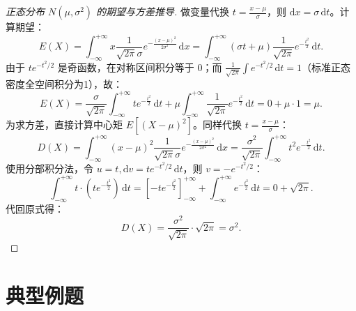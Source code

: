 ﻿\documentclass[lang=cn,11pt]{elegantbook}
\begin{document}
\begin{proof}[正态分布 $N(\mu,\sigma^2)$ 的期望与方差推导]
做变量代换 $t = \frac{x-\mu}{\sigma}$，则 $\mathrm{d}x = \sigma \,\mathrm{d}t$。计算期望：
\[
E(X) = \int_{-\infty}^{+\infty} x \frac{1}{\sqrt{2\pi}\sigma} e^{-\frac{(x-\mu)^2}{2\sigma^2}} \,\mathrm{d}x = \int_{-\infty}^{+\infty} (\sigma t + \mu) \frac{1}{\sqrt{2\pi}} e^{-\frac{t^2}{2}} \,\mathrm{d}t.
\]
由于 $t e^{-t^2/2}$ 是奇函数，在对称区间积分等于 $0$；而 $\frac{1}{\sqrt{2\pi}} \int e^{-t^2/2} \,\mathrm{d}t = 1$（标准正态密度全空间积分为1），故：
\[
E(X) = \frac{\sigma}{\sqrt{2\pi}} \int_{-\infty}^{+\infty} t e^{-\frac{t^2}{2}} \,\mathrm{d}t + \mu \int_{-\infty}^{+\infty} \frac{1}{\sqrt{2\pi}} e^{-\frac{t^2}{2}} \,\mathrm{d}t = 0 + \mu \cdot 1 = \mu.
\]
为求方差，直接计算中心矩 $E[(X-\mu)^2]$。同样代换 $t = \frac{x-\mu}{\sigma}$：
\[
D(X) = \int_{-\infty}^{+\infty} (x-\mu)^2 \frac{1}{\sqrt{2\pi}\sigma} e^{-\frac{(x-\mu)^2}{2\sigma^2}} \,\mathrm{d}x = \frac{\sigma^2}{\sqrt{2\pi}} \int_{-\infty}^{+\infty} t^2 e^{-\frac{t^2}{2}} \,\mathrm{d}t.
\]
使用分部积分法，令 $u=t, \mathrm{d}v = t e^{-t^2/2} \,\mathrm{d}t$，则 $v = -e^{-t^2/2}$：
\[
\int_{-\infty}^{+\infty} t \cdot \left( t e^{-\frac{t^2}{2}} \right) \,\mathrm{d}t = \left[ -t e^{-\frac{t^2}{2}} \right]_{-\infty}^{+\infty} + \int_{-\infty}^{+\infty} e^{-\frac{t^2}{2}} \,\mathrm{d}t = 0 + \sqrt{2\pi}.
\]
代回原式得：
\[
D(X) = \frac{\sigma^2}{\sqrt{2\pi}} \cdot \sqrt{2\pi} = \sigma^2.
\]
\end{proof}


\section{典型例题}
\end{document}
